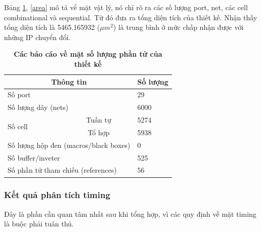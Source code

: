 Bảng \ref{cell}, \ref{area} mô tả vể mặt vật lý, nó chỉ rõ ra các số lượng port, net, các cell combinational và sequential. Từ đó đưa ra tổng diện tích của thiết kế.
Nhận thấy tổng diện tích là 5465.165932 ($\mu m^2$) là trung bình ở mức chấp nhận được với những IP chuyển đổi.
\begin{table}[H]
\centering
    \caption[Các báo cáo về mặt số lượng phần tử của thiết kế]{\bfseries \fontsize{12pt}{0pt}\selectfont Các báo cáo về mặt số lượng phần tử của thiết kế}
    \begin{tabular}{|lc|l|}
\hline
\multicolumn{2}{|c|}{\textbf{Thông tin}}                    & \multicolumn{1}{c|}{\textbf{Số lượng}} \\ \hline
\multicolumn{2}{|l|}{Số port}                               & 29                                     \\ \hline
\multicolumn{2}{|l|}{Số lượng dây (nets)}                   & 6000                                   \\ \hline
\multicolumn{1}{|l|}{\multirow{2}{*}{Số cell}}   & Tuần tự  & 5274                                   \\ \cline{2-3} 
\multicolumn{1}{|l|}{}                           & Tổ hợp   & 5938                                   \\ \hline
\multicolumn{2}{|l|}{Số lượng hộp đen (macros/black boxes)} & 0                                      \\ \hline
\multicolumn{2}{|l|}{Số buffer/inveter}                     & 525                                    \\ \hline
\multicolumn{2}{|l|}{Số phần tử tham chiếu (references)}    & 56                                     \\ \hline
\end{tabular}
    \label{cell}
    \end{table}
\subsubsection{Kết quả phân tích timing}
Đây là phần cần quan tâm nhất sau khi tổng hợp, vì các quy định về mặt timing là 
buộc phải tuân thủ.

